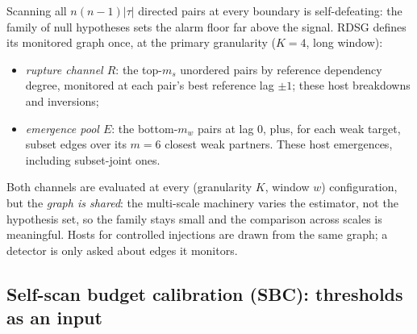 \documentclass[11pt,a4paper]{article}
\newcommand{\RDSG}{RDSG}
\begin{document}
Scanning all $n(n-1)|\tau|$ directed pairs at every boundary is self-defeating:
the family of null hypotheses sets the alarm floor far above the signal. \RDSG{}
defines its monitored graph once, at the primary granularity ($K{=}4$, long
window):
\begin{itemize}\itemsep2pt
\item \emph{rupture channel $R$}: the top-$m_s$ unordered pairs by reference
dependency degree, monitored at each pair's best reference lag $\pm1$;
these host breakdowns and inversions;
\item \emph{emergence pool $E$}: the bottom-$m_w$ pairs at lag 0, plus, for
each weak target, subset edges over its $m{=}6$ closest weak partners. These
host emergences, including subset-joint ones.
\end{itemize}
Both channels are evaluated at every (granularity $K$, window $w$) configuration,
but the \emph{graph is shared}: the multi-scale machinery varies the estimator,
not the hypothesis set, so the family stays small and the comparison across
scales is meaningful. Hosts for controlled injections are drawn from the same
graph; a detector is only asked about edges it monitors.

\subsection{Self-scan budget calibration (SBC): thresholds as an input}\label{sec:calib}
\end{document}

